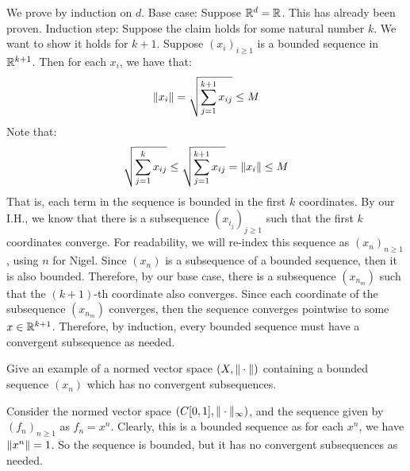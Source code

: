 \documentclass{article}
\begin{document}
\begin{soln}
    We prove by induction on $ d $. \vsp
    Base case: Suppose $ \mathbb{R}^{d} = \mathbb{R} $. This has already been proven. \vsp
    Induction step: Suppose the claim holds for some \textcolor{Emerald}{natural number $ k $}.
    We want to show it holds for $ k + 1 $. \vsp
    Suppose $ (x_{i})_{i \geq 1} $ is a \textcolor{Emerald}{bounded} sequence in $ \mathbb{R}^{k+1} $.
    \textcolor{Emerald}{
    Then for each $ x_{i} $, we have that:
    \begin{equation*}
        \|x_{i}\| = \sqrt{\sum_{j=1}^{k+1} x_{ij}} \leq M
    \end{equation*}
    Note that:
    \begin{equation*}
        \sqrt{\sum_{j=1}^{k} x_{ij}} \leq \sqrt{\sum_{j=1}^{k+1}x_{ij}} = \|x_{i}\| \leq M
    \end{equation*}
    That is, each term in the sequence is bounded in the first $ k $ coordinates.
    } \vsp
    By our I.H., we know that there is a subsequence $ (x_{i_{j}})_{j \geq 1} $ such that
    the first $ k $ coordinates converge. \textcolor{Emerald}{For readability, we will re-index
    this sequence as $ (x_{n})_{n\geq1} $, using $ n $ for Nigel.} \vsp
    Since $ (x_{n}) $ is a subsequence of a bounded sequence, then it is also bounded.
    Therefore, \textcolor{Emerald}{by our base case,}
    there is a subsequence $ (x_{n_{m}}) $ such that the $ (k+1) $-th coordinate
    also converges. \vsp
    Since each coordinate of the subsequence $ (x_{n_{m}}) $ converges, then
    the sequence converges pointwise to some $ x \in \mathbb{R}^{k+1} $.
    Therefore, by induction, every bounded sequence must have a convergent subsequence as needed.
\end{soln}

\begin{qu}
    Give an example of a normed vector space $(X, \|\cdot\|)$ containing a
    bounded sequence $(x_n)$ which has no convergent subsequences.
\end{qu}

\begin{soln}
    Consider the normed vector space $ (C[0, 1], \|\cdot\|_{\infty}) $, and the sequence
    given by $ (f_{n})_{n \geq 1} $ as $ f_{n} = x^{n} $. \vsp
    Clearly, this is a bounded sequence as for each $ x^{n} $, we have $ \|x^{n}\| = 1 $.
    So the sequence is bounded, but it has no convergent subsequences as needed.
\end{soln}
\end{document}
